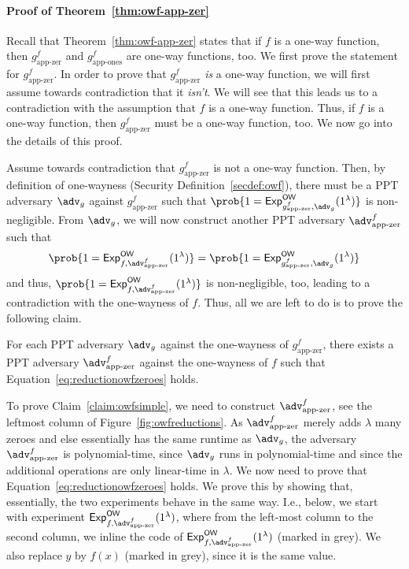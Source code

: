 \paragraph{Proof of Theorem~\ref{thm:owf-app-zer}}
Recall that Theorem~\ref{thm:owf-app-zer} states that if $f$ is a one-way function, then $g^f_{\text{app-zer}}$ and $g^f_{\text{app-ones}}$ are one-way functions, too. We first prove the statement for $g^f_{\text{app-zer}}$.
In order to prove that $g^f_{\text{app-zer}}$ \emph{is} a one-way function, we will first assume towards contradiction that it \emph{isn't}. We will see that this leads us to a contradiction with the assumption that $f$ is a one-way function. Thus, if $f$ is a one-way function, then
$g^f_{\text{app-zer}}$ must be a one-way function, too. We now go into the details of this proof.

Assume towards contradiction that $g^f_{\text{app-zer}}$ is not a one-way function. Then, by definition of one-wayness (Security Definition~\ref{secdef:owf}), there must be a PPT adversary $\adv_g$ against $g^f_{\text{app-zer}}$ such that $\prob{1={\mathsf{Exp}}_{g^f_{\text{app-zer}},\adv_g}^{\mathsf{OW}}(1^\lambda)}$ is non-negligible. From $\adv_g$, we will now construct another PPT adversary $\adv^f_{\text{app-zer}}$ such that
\begin{equation}\label{eq:reductionowfzeroes}
	\prob{1={\mathsf{Exp}}_{f,\adv^f_{\text{app-zer}}}^{\mathsf{OW}}(1^\lambda)}=\prob{1={\mathsf{Exp}}_{g^f_{\text{app-zer}},\adv_g}^{\mathsf{OW}}(1^\lambda)}
\end{equation}
and thus, $\prob{1={\mathsf{Exp}}_{f,\adv^f_{\text{app-zer}}}^{\mathsf{OW}}(1^\lambda)}$ is non-negligible, too, leading to a contradiction with the one-wayness of $f$. Thus, all we are left to do is to prove the following claim.
\begin{claim}\label{claim:owfsimple}
	For each PPT adversary $\adv_g$ against the one-wayness of $g^f_{\text{app-zer}}$, there exists a PPT adversary $\adv^f_{\text{app-zer}}$ against the one-wayness of $f$ such that Equation~\ref{eq:reductionowfzeroes} holds.
\end{claim}
To prove Claim~\ref{claim:owfsimple}, we need to construct $\adv^f_{\text{app-zer}}$, see the leftmost column of Figure~\ref{fig:owfreductions}. As $\adv^f_{\text{app-zer}}$ merely adds $\lambda$ many zeroes and else essentially has the same runtime as $\adv_g$, the adversary $\adv^f_{\text{app-zer}}$ is polynomial-time, since $\adv_g$ runs in polynomial-time and since the additional operations are only linear-time in $\lambda$. We now need to prove that Equation~\ref{eq:reductionowfzeroes} holds. We prove this by showing that, essentially, the two experiments behave in the same way. I.e., below, we start with experiment ${\mathsf{Exp}}_{f,\adv^f_{\text{app-zer}}}^{\mathsf{OW}}(1^\lambda)$, where from the left-most column to the second column, we inline the code of ${\mathsf{Exp}}_{f,\adv^f_{\text{app-zer}}}^{\mathsf{OW}}(1^\lambda)$ (marked in grey). We also replace $y$ by $f(x)$ (marked in grey), since it is the same value.
